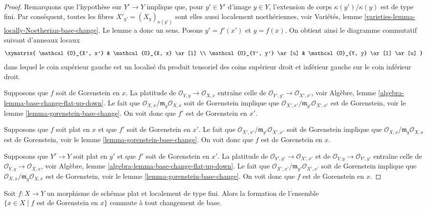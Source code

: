 \begin{proof}
Remarquons que l'hypothèse sur $Y' \to Y$ implique que, pour $y' \in Y'$ d'image $y \in Y$, l'extension de corps $\kappa(y')/\kappa(y)$ est de type fini. Par conséquent, toutes les fibres $X'_{y'} = (X_y)_{\kappa(y')}$ sont elles aussi localement noethériennes, voir Variétés, lemme \ref{varieties-lemma-locally-Noetherian-base-change}. Le lemme a donc un sens. Posons $y' = f'(x')$ et $y = f(x)$. On obtient ainsi le diagramme commutatif suivant d'anneaux locaux
$$
\xymatrix{
\mathcal{O}_{X', x'} & \mathcal{O}_{X, x} \ar[l] \\
\mathcal{O}_{Y', y'} \ar[u] & \mathcal{O}_{Y, y} \ar[l] \ar[u]
}
$$
dans lequel le coin supérieur gauche est un localisé du produit tensoriel des coins supérieur droit et inférieur gauche sur le coin inférieur droit.

\medskip\noindent
Supposons que $f$ soit de Gorenstein en $x$. La platitude de $\mathcal{O}_{Y, y} \to \mathcal{O}_{X, x}$ entraîne celle de $\mathcal{O}_{Y', y'} \to \mathcal{O}_{X', x'}$, voir Algèbre, lemme \ref{algebra-lemma-base-change-flat-up-down}. Le fait que $\mathcal{O}_{X, x}/\mathfrak m_y\mathcal{O}_{X, x}$ soit de Gorenstein implique que $\mathcal{O}_{X', x'}/\mathfrak m_{y'}\mathcal{O}_{X', x'}$ est de Gorenstein, voir le lemme \ref{lemma-gorenstein-base-change}. On voit donc que $f'$ est de Gorenstein en $x'$.

\medskip\noindent
Supposons que $f$ soit plat en $x$ et que $f'$ soit de Gorenstein en $x'$. Le fait que $\mathcal{O}_{X', x'}/\mathfrak m_{y'}\mathcal{O}_{X', x'}$ soit de Gorenstein implique que $\mathcal{O}_{X, x}/\mathfrak m_y\mathcal{O}_{X, x}$ est de Gorenstein, voir le lemme \ref{lemma-gorenstein-base-change}. On voit donc que $f$ est de Gorenstein en $x$.

\medskip\noindent
Supposons que $Y' \to Y$ soit plat en $y'$ et que $f'$ soit de Gorenstein en $x'$. La platitude de $\mathcal{O}_{Y', y'} \to \mathcal{O}_{X', x'}$ et de $\mathcal{O}_{Y, y} \to \mathcal{O}_{Y', y'}$ entraîne celle de $\mathcal{O}_{Y, y} \to \mathcal{O}_{X, x}$, voir Algèbre, lemme \ref{algebra-lemma-base-change-flat-up-down}. Le fait que $\mathcal{O}_{X', x'}/\mathfrak m_{y'}\mathcal{O}_{X', x'}$ soit de Gorenstein implique que $\mathcal{O}_{X, x}/\mathfrak m_y\mathcal{O}_{X, x}$ est de Gorenstein, voir le lemme \ref{lemma-gorenstein-base-change}. On voit donc que $f$ est de Gorenstein en $x$.
\end{proof}

\begin{lemma}
\label{lemma-flat-lft-base-change-gorenstein}
Soit $f : X \to Y$ un morphisme de schémas plat et localement de type fini. Alors la formation de l'ensemble
$\{x \in X \mid f\text{ est de Gorenstein en }x\}$
commute à tout changement de base.
\end{lemma}

